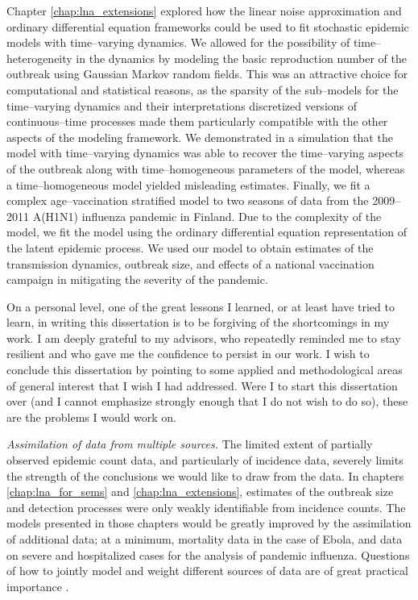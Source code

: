 Chapter \ref{chap:lna_extensions} explored how the linear noise approximation and ordinary differential equation frameworks could be used to fit stochastic epidemic models with time--varying dynamics. We allowed for the possibility of time--heterogeneity in the dynamics by modeling the basic reproduction number of the outbreak using Gaussian Markov random fields. This was an attractive choice for computational and statistical reasons, as the sparsity of the sub--models for the time--varying dynamics and their interpretations discretized versions of continuous--time processes made them particularly compatible with the other aspects of the modeling framework. We demonstrated in a simulation that the model with time--varying dynamics was able to recover the time--varying aspects of the outbreak along with time--homogeneous parameters of the model, whereas a time--homogeneous model yielded misleading estimates. Finally, we fit a complex age--vaccination stratified model to two seasons of data from the 2009--2011 A(H1N1) influenza pandemic in Finland. Due to the complexity of the model, we fit the model using the ordinary differential equation representation of the latent epidemic process. We used our model to obtain estimates of the transmission dynamics, outbreak size, and effects of a national vaccination campaign in mitigating the severity of the pandemic. 

On a personal level, one of the great lessons I learned, or at least have tried to learn, in writing this dissertation is to be forgiving of the shortcomings in my work. I am deeply grateful to my advisors, who repeatedly reminded me to stay resilient and who gave me the confidence to persist in our work. I wish to conclude this dissertation by pointing to some applied and methodological areas of general interest that I wish I had addressed. Were I to start this dissertation over (and I cannot emphasize strongly enough that I do not wish to do so), these are the problems I would work on. 

\textit{Assimilation of data from multiple sources.}
The limited extent of partially observed epidemic count data, and particularly of incidence data, severely limits the strength of the conclusions we would like to draw from the data. In chapters \ref{chap:lna_for_sems} and \ref{chap:lna_extensions}, estimates of the outbreak size and detection processes were only weakly identifiable from incidence counts. The models presented in those chapters would be greatly improved by the assimilation of additional data; at a minimum, mortality data in the case of Ebola, and data on severe and hospitalized cases for the analysis of pandemic influenza. Questions of how to jointly model and weight different sources of data are of great practical importance \cite{deangelis2015four}. 


